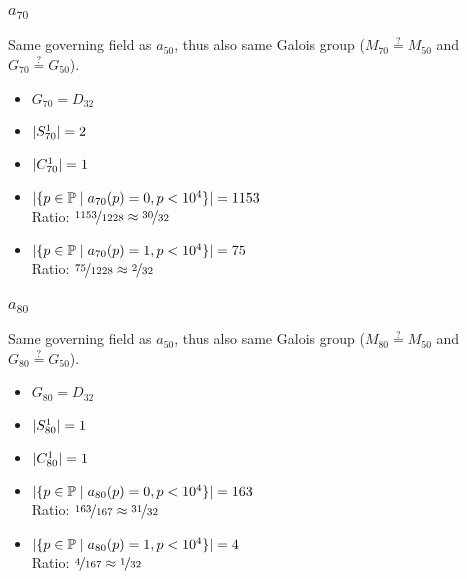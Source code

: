 \subsubsection{$a_{70}$}
Same governing field as $a_{50}$, thus also same Galois group ($M_{70} \stackrel{?}{=} M_{50}$ and $G_{70} \stackrel{?}{=} G_{50}$).
\begin{multicols}{2}
	\begin{itemize}
		\item $G_{70} = D_{32}$
		\item $| S_{70}^1 | = 2$
		\item $| C_{70}^1 | = 1$
	\end{itemize}
	\begin{itemize}
		\item $| \{ p \in \mathbb{P} \mid a_{70}(p)=0, p<10^4 \} | = 1153$\\
		Ratio: $\nicefrac{ 1153 }{ 1228 } \approx \nicefrac{ 30 }{ 32 }$
		\item $| \{ p \in \mathbb{P} \mid a_{70}(p)=1, p<10^4 \} | = 75$\\
		Ratio: $\nicefrac{ 75 }{ 1228 } \approx \nicefrac{ 2 }{ 32 }$
	\end{itemize}
\end{multicols}

\subsubsection{$a_{80}$}
Same governing field as $a_{50}$, thus also same Galois group ($M_{80} \stackrel{?}{=} M_{50}$ and $G_{80} \stackrel{?}{=} G_{50}$).
\begin{multicols}{2}
	\begin{itemize}
		\item $G_{80} = D_{32}$
		\item $| S_{80}^1 | = 1$
		\item $| C_{80}^1 | = 1$
	\end{itemize}
	\begin{itemize}
		\item $| \{ p \in \mathbb{P} \mid a_{80}(p)=0, p<10^4 \} | = 163$\\
		Ratio: $\nicefrac{ 163 }{ 167 } \approx \nicefrac{ 31 }{ 32 }$
		\item $| \{ p \in \mathbb{P} \mid a_{80}(p)=1, p<10^4 \} | = 4$\\
		Ratio: $\nicefrac{ 4 }{ 167 } \approx \nicefrac{ 1 }{ 32 }$
	\end{itemize}
\end{multicols}



